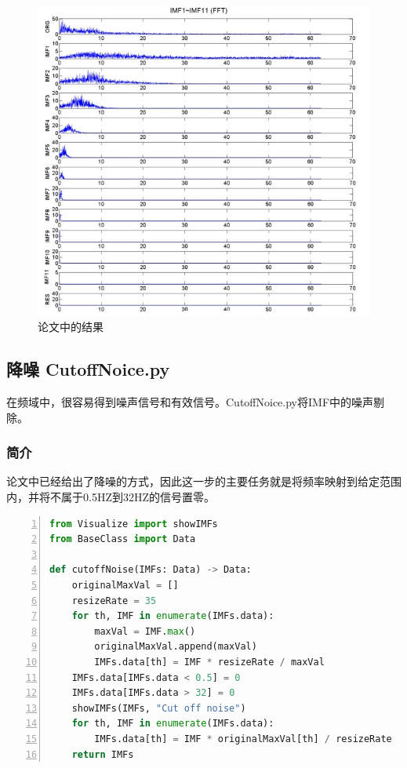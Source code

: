 \documentclass[cs4size,a4paper]{ctexart}
\numberwithin{equation}{section}
\numberwithin{table}{section}
\numberwithin{figure}{section}
\begin{document}
\begin{figure}[H]
\small
\centering
\includegraphics{IMF-Fre-FromPaper.jpg}
\caption{论文中的结果} \label{fig:IMF-Fre-FromPaper}
\end{figure}

\subsection{降噪 CutoffNoice.py}

在频域中，很容易得到噪声信号和有效信号。\colorbox{LetMeFlyGray}{CutoffNoice.py}将IMF中的噪声剔除。

\subsubsection{简介}

论文中已经给出了降噪的方式，因此这一步的主要任务就是将频率映射到给定范围内，并将不属于0.5HZ到32HZ的信号置零。

\begin{lstlisting}[language={python},
numbers=left,
numberstyle=\tiny\monaco,
basicstyle=\footnotesize\monaco]
from Visualize import showIMFs
from BaseClass import Data

def cutoffNoise(IMFs: Data) -> Data:
    originalMaxVal = []
    resizeRate = 35
    for th, IMF in enumerate(IMFs.data):
        maxVal = IMF.max()
        originalMaxVal.append(maxVal)
        IMFs.data[th] = IMF * resizeRate / maxVal
    IMFs.data[IMFs.data < 0.5] = 0
    IMFs.data[IMFs.data > 32] = 0
    showIMFs(IMFs, "Cut off noise")
    for th, IMF in enumerate(IMFs.data):
        IMFs.data[th] = IMF * originalMaxVal[th] / resizeRate
    return IMFs
\end{lstlisting}
\end{document}
